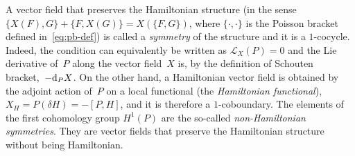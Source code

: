 \documentclass[10pt,a4paper]{amsart}
\numberwithin{equation}{section}
\begin{document}
A vector field that preserves the Hamiltonian structure (in the sense $\{X(F),G\}+\{F,X(G)\}=X(\{F,G\})$, where $\{\cdot,\cdot\}$ is the Poisson bracket defined in~\eqref{eq:pb-def}) is called a \emph{symmetry} of the structure and it is a $1$-cocycle. Indeed, the condition can equivalently be written as $\mathcal{L}_X(P)=0$ and the Lie derivative of~$P$ along the vector field~$X$ is, by the definition of Schouten bracket,~$-{\rm d}_PX$. On the other hand, a Hamiltonian vector field is obtained by the adjoint action of~$P$ on a local functional (the \emph{Hamiltonian functional}), $X_H=P(\delta H)=-[P,H]$, and it is therefore a $1$-coboundary. The elements of the first cohomology group $H^1(P)$ are the so-called \emph{non-Hamiltonian symmetries}. They are vector fields that preserve the Hamiltonian structure without being Hamiltonian.
\end{document}
